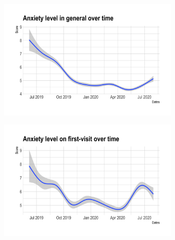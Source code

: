 \documentclass[11pt]{article}
\begin{document}
\begin{figure}[htb!]
	\caption{Time trends}\label{fig:picture7}
	\begin{subfigure}[h]{0.48\linewidth}
		\includegraphics[width=\linewidth]{Figures/ppp3.png}
		\caption{}\label{fig:ppp3}
	\end{subfigure}
	\hfill
	\begin{subfigure}[h]{0.48\linewidth}
		\includegraphics[width=\linewidth]{Figures/ppp4.png}
		\caption{}\label{fig:ppp4}
	\end{subfigure}
\end{figure}
\end{document}
